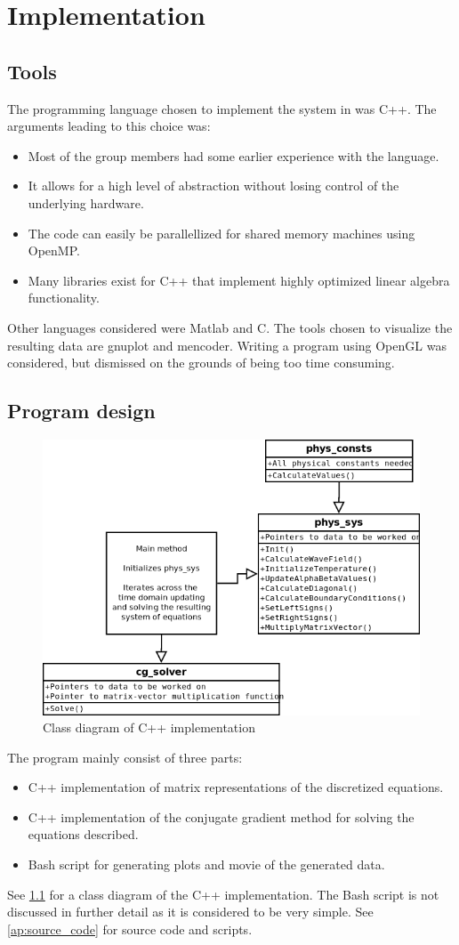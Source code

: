 
\chapter{Implementation}\label{avs:implementation}

\section{Tools}

The programming language chosen to implement the system in was C++.
The arguments leading to this choice was:
\begin{itemize}
\item Most of the group members had some earlier experience with the language.
\item It allows for a high level of abstraction without losing control of the
underlying hardware.
\item The code can easily be parallellized for shared memory machines using OpenMP.
\item Many libraries exist for C++ that implement highly optimized linear algebra
functionality.
\end{itemize}
Other languages considered were Matlab and C.
The tools chosen to visualize the resulting data are gnuplot and mencoder. Writing a
program using OpenGL was considered, but dismissed on the grounds of being too time consuming.

\section{Program design}
\begin{figure}[!h]
  \begin{center}
    \includegraphics[width=0.5\linewidth]{classdiagram.png}
  \end{center}
  \caption{Class diagram of C++ implementation}
  \label{fig:classdiagram}
\end{figure}
The program mainly consist of three parts:
\begin{itemize}
\item C++ implementation of matrix representations of the discretized equations.
\item C++ implementation of the conjugate gradient method for solving the
equations described.
\item Bash script for generating plots and movie of the generated data.
\end{itemize}
See \cref{fig:classdiagram} for a class diagram of the C++ implementation.
The Bash script is not discussed in further detail as it is considered to be
very simple. See \cref{ap:source_code} for source code and scripts.

